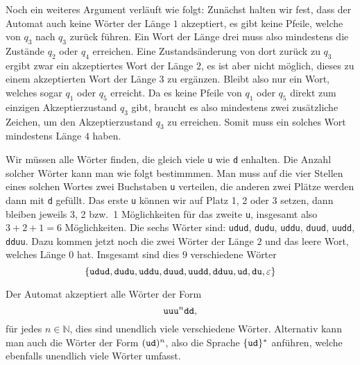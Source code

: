\begin{loesung}
\begin{teilaufgaben}
Noch ein weiteres Argument verläuft wie folgt:
Zunächst halten wir fest, dass der Automat auch keine Wörter der
Länge $1$ akzeptiert, es gibt keine Pfeile, welche von $q_3$ nach
$q_3$ zurück führen. Ein Wort der Länge drei muss also mindestens
die Zustände $q_2$ oder $q_4$ erreichen. Eine Zustandsänderung von
dort zurück zu $q_3$ ergibt zwar ein akzeptiertes Wort der Länge
$2$, es ist aber nicht möglich, dieses zu einem akzeptierten Wort
der Länge $3$ zu ergänzen.
Bleibt also nur ein Wort, welches
sogar $q_1$ oder $q_5$ erreicht. Da es keine Pfeile von $q_1$
oder $q_5$ direkt zum einzigen Akzeptierzustand $q_3$ gibt,
braucht es also mindestens zwei zusätzliche Zeichen, um den
Akzeptierzustand $q_3$ zu erreichen. Somit muss ein solches
Wort mindestens Länge $4$ haben.
\item Wir müssen alle Wörter finden, die gleich viele {\tt u} wie {\tt d}
enhalten. Die Anzahl solcher Wörter kann man wie folgt bestimmmen.
Man muss auf die vier Stellen eines solchen Wortes zwei Buchstaben
{\tt u} verteilen, die anderen zwei Plätze werden dann mit {\tt d}
gefüllt. Das erste {\tt u} können wir auf Platz 1, 2 oder 3 setzen,
dann bleiben jeweils 3, 2 bzw.~1 Möglichkeiten für das zweite {\tt u},
insgesamt also $3+2+1=6$ Möglichkeiten. Die sechs Wörter sind:
{\tt udud}, {\tt dudu}, {\tt uddu}, {\tt duud}, {\tt uudd}, {\tt dduu}.
Dazu kommen jetzt noch die zwei Wörter der Länge $2$ und das leere Wort,
welches Länge $0$ hat. Insgesamt sind dies $9$ verschiedene Wörter
\[
\{
{\tt udud}, {\tt dudu}, {\tt uddu}, {\tt duud}, {\tt uudd}, {\tt dduu},
{\tt ud},{\tt du}, \varepsilon
\}
\]
\item Der Automat akzeptiert alle Wörter der Form
\[
\text{\tt uu}
\text{\tt u}^n
\text{\tt dd},
\]
für jedes $n\in \mathbb N$,
dies sind unendlich viele verschiedene Wörter. Alternativ kann
man auch die Wörter der Form $({\tt ud})^n$, also die Sprache
$\{{\tt ud}\}^*$ anführen, welche ebenfalls unendlich viele Wörter
umfasst.
\qedhere
\end{teilaufgaben}
\end{loesung}

